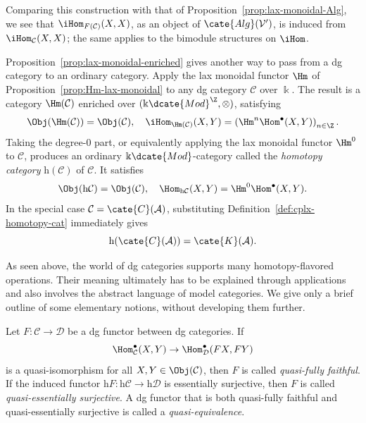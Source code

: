 Comparing this construction with that of
Proposition~\ref{prop:lax-monoidal-Alg}, we see that
$\iHom_{F(\mathcal{C})}(X,X)$, as an object of $\cate{Alg}(\mathcal{V}')$,
is induced from $\iHom_{\mathcal{C}}(X,X)$; the same applies to the bimodule
structures on $\iHom$.

\begin{remark}\label{rem:dg-homotopy-cat}
	Proposition~\ref{prop:lax-monoidal-enriched} gives another way to pass from
	a dg category to an ordinary category. Apply the lax monoidal functor $\Hm$
	of Proposition~\ref{prop:Hm-lax-monoidal} to any dg category $\mathcal{C}$
	over $\Bbbk$. The result is a category $\Hm(\mathcal{C})$ enriched over
	$(\Bbbk\dcate{Mod}^{\Z},\otimes)$, satisfying
	\[ \Obj(\Hm(\mathcal{C})) = \Obj(\mathcal{C}), \quad \iHom_{\Hm(\mathcal{C})}(X, Y) = \left( \Hm^n \Hom^\bullet(X, Y) \right)_{n \in \Z}. \]
	Taking the degree-$0$ part, or equivalently applying the lax monoidal
	functor $\Hm^0$ to $\mathcal{C}$, produces an ordinary
	$\Bbbk\dcate{Mod}$-category called the \emph{homotopy category}
	$\mathrm{h}(\mathcal{C})$ of $\mathcal{C}$. It satisfies
	\[ \Obj(\mathrm{h}\mathcal{C}) = \Obj(\mathcal{C}), \quad \Hom_{\mathrm{h}\mathcal{C}}(X, Y) = \Hm^0 \Hom^\bullet(X, Y). \]
	In the special case $\mathcal{C}=\cate{C}(\mathcal{A})$, substituting
	Definition~\ref{def:cplx-homotopy-cat} immediately gives
	\[ \mathrm{h}(\cate{C}(\mathcal{A})) = \cate{K}(\mathcal{A}). \]
\end{remark}

As seen above, the world of dg categories supports many homotopy-flavored
operations. Their meaning ultimately has to be explained through
applications and also involves the abstract language of model categories.
We give only a brief outline of some elementary notions, without developing
them further.

\begin{definition}
	Let $F:\mathcal{C}\to\mathcal{D}$ be a dg functor between dg categories.
	If
	\[ \Hom^\bullet_{\mathcal{C}}(X, Y) \to \Hom^\bullet_{\mathcal{D}}(FX, FY) \]
	is a quasi-isomorphism for all $X,Y\in\Obj(\mathcal{C})$, then $F$ is
	called \emph{quasi-fully faithful}. If the induced functor
	$\mathrm{h}F:\mathrm{h}\mathcal{C}\to\mathrm{h}\mathcal{D}$ is
	essentially surjective, then $F$ is called \emph{quasi-essentially
	surjective}. A dg functor that is both quasi-fully faithful and
	quasi-essentially surjective is called a \emph{quasi-equivalence}.
\end{definition}

